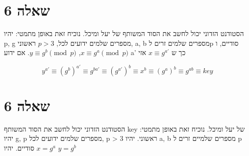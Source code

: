 \documentclass{article}
\begin{document}

\section*{שאלה 6}

הסטודנט הזדוני יכול לחשב את הסוד המשותף של יעל ומיכל. נוכיח זאת באופן מתמטי:
יהיו p, g מספרים שלמים ידועים לכל,
$p > 3$
ראשוני,
a, b מספרים שלמים זרים לp סודיים,
ו 
$x \equiv g^a \pmod{p}$,
$y \equiv g^b \pmod{p}$.
אם ידוע
a'
כך ש
$x \equiv g^{a'}$
אזי

$$ y^{a'} \equiv (g^b)^{a'} \equiv g^{ba'} \equiv (g^{a'})^b \equiv x^b
\equiv (g^a)^b \equiv g^{ab} \equiv key$$

\section*{שאלה 6}

הסטודנט הזדוני יכול לחשב את הסוד המשותף key של יעל ומיכל.
נוכיח זאת באופן מתמטי:
יהיו g, p מספרים שלמים ידועים לכל,
p > 3
ראשוני.
יהיו a, b מספרים שלמיים זרים ל p סודיים.
יהיו
$x = g^a$
$y = g^b$
\end{document}
